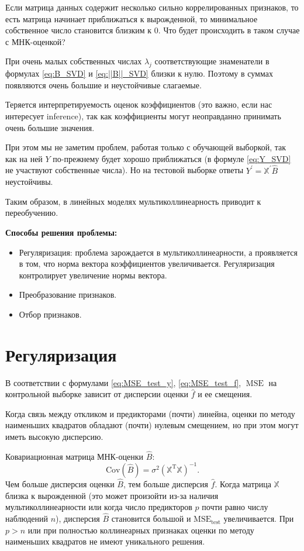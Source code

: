 \documentclass[11pt,colorlinks=true]{article}
\DeclareMathOperator{\T}{T}
\DeclareMathOperator{\MSE}{MSE}
\begin{document}
Если матрица данных содержит несколько сильно коррелированных признаков, то есть матрица начинает приближаться к вырожденной, то минимальное собственное число становится близким к $0$.
 Что будет происходить в таком случае с МНК-оценкой? 

При очень малых собственных числах $\lambda_{j}$ соответствующие знаменатели в формулах \eqref{eq:B_SVD} и \eqref{eq:||B||_SVD} близки к нулю. Поэтому в суммах появляются очень большие и неустойчивые слагаемые.

Теряется интерпретируемость оценок коэффициентов (это важно, если нас интересует inference), так как коэффициенты могут неоправданно принимать очень большие значения. 

При этом мы не заметим проблем, работая только с обучающей выборкой, так как на ней $Y$ по-прежнему будет хорошо приближаться (в формуле \eqref{eq:Y_SVD} не участвуют собственные числа). Но на тестовой выборке ответы $Y^{\prime}=\mathbb{X}^{\prime}\hat{B}$  неустойчивы.


Таким образом, в линейных моделях мультиколлинеарность приводит к переобучению.

\textbf{Способы решения проблемы:}
\begin{itemize}
\item Регуляризация: проблема зарождается в мультиколлинеарности, а проявляется в том, что норма вектора коэффициентов увеличивается. Регуляризация контролирует увеличение нормы вектора.
\item Преобразование признаков.
\item Отбор признаков.
\end{itemize}


\section{Регуляризация}

В соответствии с формулами \eqref{eq:MSE_test_y}, \eqref{eq:MSE_test_f}, $\MSE$ на контрольной выборке зависит от дисперсии оценки $\hat{f}$ и ее смещения.

Когда связь между откликом и предикторами (почти) линейна, оценки по методу наименьших квадратов обладают (почти) нулевым смещением, но при этом могут иметь высокую дисперсию. 

Ковариационная матрица МНК-оценки $\hat{B}$: 
\begin{equation}\label{eq:Cov_ols}
\mathrm{Cov}(\hat{B}) = \sigma^2(\mathbb{X}^{\T}\mathbb{X})^{-1}.
\end{equation}
Чем больше дисперсия оценки $\hat{B}$, тем больше дисперсия $\hat{f}$. Когда матрица $\mathbb{X}$ близка к вырожденной (это может произойти из-за наличия мультиколлинеарности или когда число предикторов $p$ почти равно числу наблюдений $n$), дисперсия $\hat{B}$ становится большой и $\mathrm{MSE}_{\mathrm{test}}$ увеличивается.  При $p>n$ или при полностью коллинеарных признаках оценки по методу наименьших квадратов не имеют уникального решения.
\end{document}
